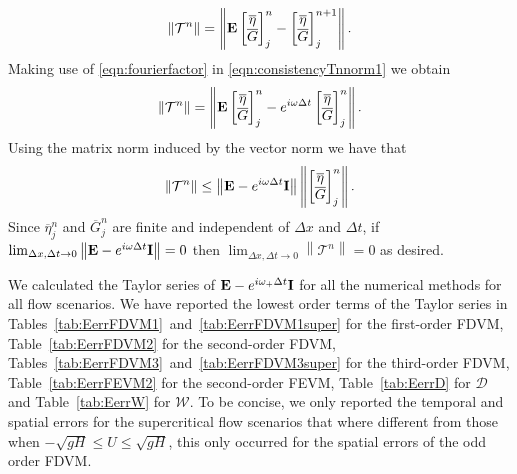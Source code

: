 \begin{equation}
\left \|\mathcal{T}^n \right \| = \left \|  \mathbf{E}\begin{bmatrix}
\overline{\eta} \\ \overline{G}
\end{bmatrix}^{n}_j - \begin{bmatrix}
\overline{\eta} \\ \overline{G}
\end{bmatrix}^{n+1}_j \right \|.
\label{eqn:consistencyTnnorm1}
\end{equation}
Making use of \eqref{eqn:fourierfactor} in \eqref{eqn:consistencyTnnorm1} we obtain
\begin{equation*}
\left \|\mathcal{T}^n \right \| = \left \|  \mathbf{E}\begin{bmatrix}
\overline{\eta} \\ \overline{G}
\end{bmatrix}^{n}_j -  e^{i \omega \Delta t} \begin{bmatrix}
\overline{\eta} \\ \overline{G}
\end{bmatrix}^{n}_j \right \|.
\end{equation*}
Using the matrix norm induced by the vector norm we have that
\begin{equation}
\left \|\mathcal{T}^n \right \|  \le \left \| \mathbf{E} -  e^{i \omega \Delta t}\mathbf{I} \right \| \left \| \begin{bmatrix}
\overline{\eta} \\ \overline{G}
\end{bmatrix}^{n}_j\right \|.
\end{equation}
Since $\overline{\eta}^n_j$ and  $\overline{G}^n_j$ are finite and independent of $\Delta x$ and $\Delta t$, if $ \lim_{\Delta x,\Delta t \rightarrow 0}\left \| \mathbf{E} -  e^{i \omega \Delta t}\mathbf{I} \right \| = 0 $ then $ \lim_{\Delta x,\Delta t \rightarrow 0}\left \| \mathcal{T}^n \right \| = 0 $ as desired.

We calculated the Taylor series of $\mathbf{E} -  e^{i \omega_+ \Delta t}\mathbf{I}$ for all the numerical methods for all flow scenarios. We have reported the lowest order terms of the Taylor series in Tables~\ref{tab:EerrFDVM1}~and~\ref{tab:EerrFDVM1super} for the first-order FDVM, Table~\ref{tab:EerrFDVM2} for the second-order FDVM, Tables~\ref{tab:EerrFDVM3}~and~\ref{tab:EerrFDVM3super} for the third-order FDVM,  Table~\ref{tab:EerrFEVM2} for the second-order FEVM, Table~\ref{tab:EerrD} for $\mathcal{D}$ and Table~\ref{tab:EerrW} for $\mathcal{W}$. To be concise, we only reported the temporal and spatial errors for the supercritical flow scenarios that where different from those when $ -\sqrt{gH} \le U \le \sqrt{gH}$, this only occurred for the spatial errors of the odd order FDVM. 

